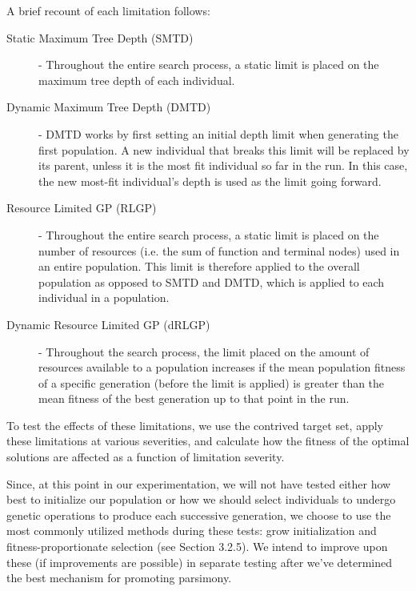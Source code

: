 \documentclass[12pt]{report} 	%
\numberwithin{figure}{chapter}
\numberwithin{table}{chapter}
\numberwithin{equation}{chapter}
\begin{document}
\begin{flushleft}
A brief recount of each limitation follows:
\begin{description}
\item [Static Maximum Tree Depth (SMTD)] - Throughout the entire search process, a static limit is placed on the maximum tree depth of each individual.
\item [Dynamic Maximum Tree Depth (DMTD)] - DMTD works by first setting an initial depth limit when generating the first population. A new individual that breaks this limit will be replaced by its parent, unless it is the most fit individual so far in the run. In this case, the new most-fit individual's depth is used as the limit going forward.
\item [Resource Limited GP (RLGP)] - Throughout the entire search process, a static limit is placed on the number of resources (i.e. the sum of function and terminal nodes) used in an entire population. This limit is therefore applied to the overall population as opposed to SMTD and DMTD, which is applied to each individual in a population.
\item [Dynamic Resource Limited GP (dRLGP)] - Throughout the search process, the limit placed on the amount of resources available to a population increases if the mean population fitness of a specific generation (before the limit is applied) is greater than the mean fitness of the best generation up to that point in the run. 
\end{description}

To test the effects of these limitations, we use the contrived target set, apply these limitations at various severities, and calculate how the fitness of the optimal solutions are affected as a function of limitation severity. 

Since, at this point in our experimentation, we will not have tested either how best to initialize our population or how we should select individuals to undergo genetic operations to produce each successive generation, we choose to use the most commonly utilized methods during these tests: grow initialization and fitness-proportionate selection (see Section 3.2.5). We intend to improve upon these (if improvements are possible) in separate testing after we've determined the best mechanism for promoting parsimony. 


\end{flushleft}
\end{document}
